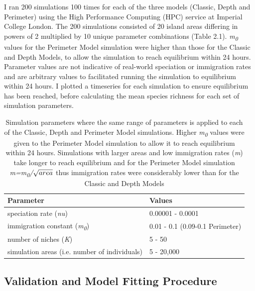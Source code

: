 \noindent 


\noindent I ran 200 simulations 100 times for each of the three models (Classic, Depth and Perimeter) using the High Performance Computing (HPC) service at Imperial College London. The 200 simulations consisted of 20 island areas differing in powers of 2 multiplied by 10 unique parameter combinations (Table 2.1). \textit{m\textsubscript{0}} values for the Perimeter Model simulation were higher than those for the Classic and Depth Models, to allow the simulation to reach equilibrium within 24 hours. Parameter values are not indicative of real-world speciation or immigration rates and are arbitrary values to facilitated running the simulation to equilibrium within 24 hours. I plotted a timeseries for each simulation to ensure equilibrium has been reached, before calculating the mean species richness for each set of  simulation parameters.\\

\begin{table}[h]
\centering
    \caption{Simulation parameters where the same range of parameters is applied to each of the Classic, Depth and Perimeter Model simulations. Higher \textit{m\textsubscript{0}} values were given to the Perimeter Model simulation to allow it to reach equilibrium within 24 hours. Simulations with larger areas and low immigration rates (\textit{m}) take longer to reach equilibrium and for the Perimeter Model simulation \textit{m=m\textsubscript{0}/$\protect\sqrt{area}$} thus immigration rates were considerably lower than for the Classic and Depth Models}
    \label{crouch}
    \begin{tabular}{  l  p{5cm}}
        \toprule
\textbf{Parameter} 
&\textbf{Values}   \\\midrule
speciation rate (\textit{nu})
&0.00001 - 0.0001 \\\hline
immigration constant (\textit{m\textsubscript{0}})
&0.01 - 0.1 (0.09-0.1 Perimeter)\\\hline
number of niches (\textit{K})
&5 - 50 \\\hline
simulation areas (i.e. number of individuals)
& 5 - 20,000 \\
        \bottomrule
    \end{tabular}
\end{table}

 
\subsection{Validation and Model Fitting Procedure}

